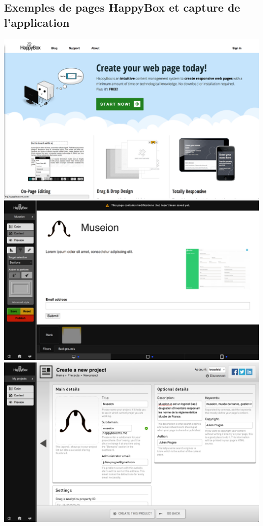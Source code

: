 \documentclass[11pt, a4paper ]{article}
\let\stdsection\section
\renewcommand\section{\newpage\stdsection}
\begin{document}
\begin{spacing}{1.5}
	\section{Exemples de pages HappyBox et capture de l'application}
	\includegraphics[width=\textwidth]{images/HBscreen/1}
	\includegraphics[width=\textwidth]{images/HBscreen/2}
	\includegraphics[width=\textwidth]{images/HBscreen/3}

\end{spacing}
\end{document}
